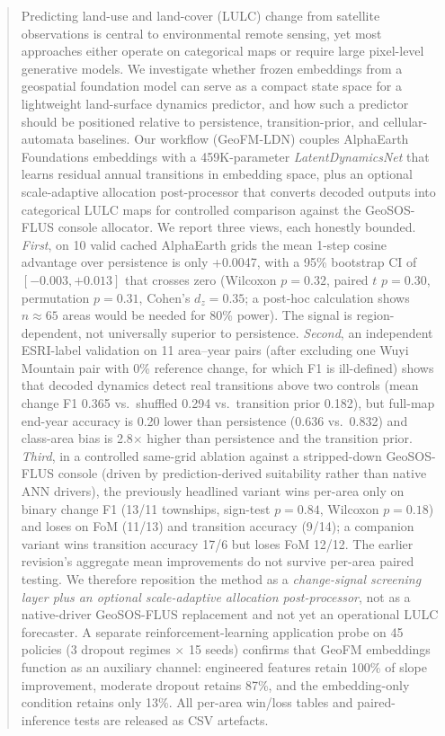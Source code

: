 \documentclass{article}
\begin{document}
\begin{abstract}
Predicting land-use and land-cover (LULC) change from satellite observations is central to environmental remote sensing, yet most approaches either operate on categorical maps or require large pixel-level generative models. We investigate whether frozen embeddings from a geospatial foundation model can serve as a compact state space for a lightweight land-surface dynamics predictor, and how such a predictor should be positioned relative to persistence, transition-prior, and cellular-automata baselines. Our workflow (GeoFM-LDN) couples AlphaEarth Foundations embeddings with a 459K-parameter \textit{LatentDynamicsNet} that learns residual annual transitions in embedding space, plus an optional scale-adaptive allocation post-processor that converts decoded outputs into categorical LULC maps for controlled comparison against the GeoSOS-FLUS console allocator. We report three views, each honestly bounded. \textit{First}, on 10 valid cached AlphaEarth grids the mean 1-step cosine advantage over persistence is only +0.0047, with a 95\% bootstrap CI of $[-0.003, +0.013]$ that crosses zero (Wilcoxon $p=0.32$, paired $t$ $p=0.30$, permutation $p=0.31$, Cohen's $d_z=0.35$; a post-hoc calculation shows $n\approx 65$ areas would be needed for 80\% power). The signal is region-dependent, not universally superior to persistence. \textit{Second}, an independent ESRI-label validation on 11 area--year pairs (after excluding one Wuyi Mountain pair with 0\% reference change, for which F1 is ill-defined) shows that decoded dynamics detect real transitions above two controls (mean change F1 0.365 vs.\ shuffled 0.294 vs.\ transition prior 0.182), but full-map end-year accuracy is 0.20 lower than persistence (0.636 vs.\ 0.832) and class-area bias is 2.8$\times$ higher than persistence and the transition prior. \textit{Third}, in a controlled same-grid ablation against a stripped-down GeoSOS-FLUS console (driven by prediction-derived suitability rather than native ANN drivers), the previously headlined variant wins per-area only on binary change F1 (13/11 townships, sign-test $p=0.84$, Wilcoxon $p=0.18$) and loses on FoM (11/13) and transition accuracy (9/14); a companion variant wins transition accuracy 17/6 but loses FoM 12/12. The earlier revision's aggregate mean improvements do not survive per-area paired testing. We therefore reposition the method as a \textit{change-signal screening layer plus an optional scale-adaptive allocation post-processor}, not as a native-driver GeoSOS-FLUS replacement and not yet an operational LULC forecaster. A separate reinforcement-learning application probe on 45 policies (3 dropout regimes $\times$ 15 seeds) confirms that GeoFM embeddings function as an auxiliary channel: engineered features retain 100\% of slope improvement, moderate dropout retains 87\%, and the embedding-only condition retains only 13\%. All per-area win/loss tables and paired-inference tests are released as CSV artefacts.
\end{abstract}
\end{document}
